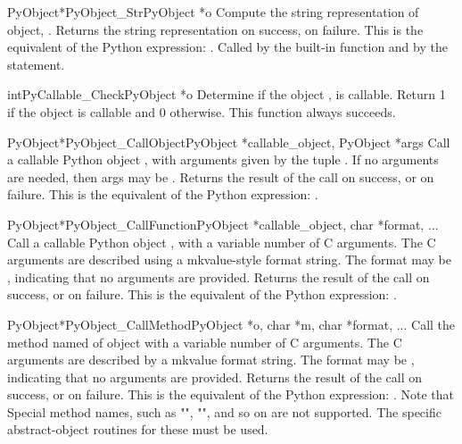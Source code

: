      \begin{cfuncdesc}{PyObject*}{PyObject_Str}{PyObject *o}
	 Compute the string representation of object, .  Returns the
	 string representation on success, {\NULL} on failure.  This is
	 the equivalent of the Python expression: .
	 Called by the  built-in function and by the 
	 statement.
     \end{cfuncdesc}


     \begin{cfuncdesc}{int}{PyCallable_Check}{PyObject *o}
	 Determine if the object , is callable.  Return 1 if the
	 object is callable and 0 otherwise.
	 This function always succeeds.
     \end{cfuncdesc}


     \begin{cfuncdesc}{PyObject*}{PyObject_CallObject}{PyObject *callable_object, PyObject *args}
	 Call a callable Python object , with
	 arguments given by the tuple .  If no arguments are
	 needed, then args may be {\NULL}.  Returns the result of the
	 call on success, or {\NULL} on failure.  This is the equivalent
	 of the Python expression: .
     \end{cfuncdesc}

     \begin{cfuncdesc}{PyObject*}{PyObject_CallFunction}{PyObject *callable_object, char *format, ...}
         Call a callable Python object , with a
         variable number of C arguments. The C arguments are described
         using a mkvalue-style format string. The format may be {\NULL},
         indicating that no arguments are provided.  Returns the
         result of the call on success, or {\NULL} on failure.  This is
         the equivalent of the Python expression: .
     \end{cfuncdesc}


     \begin{cfuncdesc}{PyObject*}{PyObject_CallMethod}{PyObject *o, char *m, char *format, ...}
         Call the method named  of object  with a variable number of
         C arguments.  The C arguments are described by a mkvalue
         format string.  The format may be {\NULL}, indicating that no
         arguments are provided. Returns the result of the call on
         success, or {\NULL} on failure.  This is the equivalent of the
         Python expression: .
         Note that Special method names, such as "",
         "", and so on are not supported. The specific
         abstract-object routines for these must be used.
     \end{cfuncdesc}


